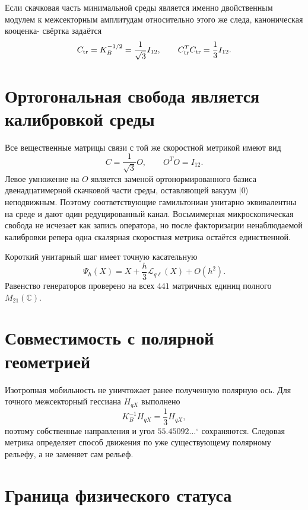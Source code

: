 Если скачковая часть минимальной среды является именно двойственным модулем к
межсекторным амплитудам относительно этого же следа, каноническая кооценка-
свёртка задаётся
\begin{equation}
 C_{\rm tr}=K_B^{-1/2}=\frac1{\sqrt3}I_{12},
 \qquad
 C_{\rm tr}^TC_{\rm tr}=\frac13I_{12}.
 \label{eq:v8-trace-dual-canonical-coupling}
\end{equation}

\section{Ортогональная свобода является калибровкой среды}

Все вещественные матрицы связи с той же скоростной метрикой имеют вид
\begin{equation}
 C=\frac1{\sqrt3}O,
 \qquad O^TO=I_{12}.
 \label{eq:v8-cross-coupling-orthogonal-factor}
\end{equation}
Левое умножение на $O$ является заменой ортонормированного базиса
двенадцатимерной скачковой части среды, оставляющей вакуум $|0\rangle$
неподвижным. Поэтому соответствующие гамильтониан унитарно эквивалентны на
среде и дают один редуцированный канал. Восьмимерная микроскопическая
свобода не исчезает как запись оператора, но после факторизации
ненаблюдаемой калибровки репера одна скалярная скоростная метрика остаётся
единственной.

Короткий унитарный шаг имеет точную касательную
\begin{equation}
 \Psi_h(X)
 =X+\frac h3\mathcal L_{q\ell}(X)+O(h^2).
 \label{eq:v8-trace-dual-cross-gksl-tangent}
\end{equation}
Равенство генераторов проверено на всех $441$ матричных единиц полного
$M_{21}(\mathbb C)$.

\section{Совместимость с полярной геометрией}

Изотропная мобильность не уничтожает ранее полученную полярную ось. Для
точного межсекторный гессиана $H_{qX}$ выполнено
\begin{equation}
 K_B^{-1}H_{qX}=\frac13H_{qX},
\end{equation}
поэтому собственные направления и угол $55.45092\ldots^\circ$ сохраняются.
Следовая метрика определяет способ движения по уже существующему
полярному рельефу, а не заменяет сам рельеф.

\section{Граница физического статуса}


